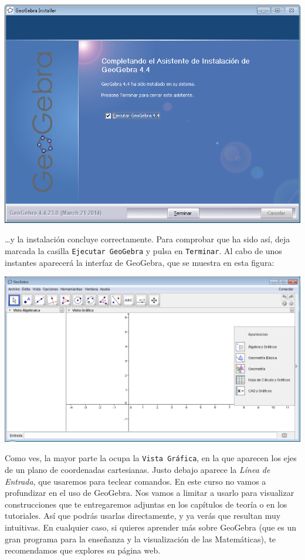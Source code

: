 \documentclass[10pt,a4paper]{article}\usepackage[]{graphicx}\usepackage[]{color}
\begin{document}
    \begin{center}
    \includegraphics[width=14cm]{../fig/Tut00-GeoGebraSetup05.png}
    \end{center}
\ldots y la instalación concluye correctamente. Para comprobar que ha sido así, deja marcada la
casilla {\tt Ejecutar GeoGebra} y pulsa en {\tt Terminar}. Al cabo de unos instantes aparecerá la
interfaz de GeoGebra, que se muestra en esta figura:
    \begin{center}
    \includegraphics[width=15cm]{../fig/Tut00-GeoGebraSetup06.png}
    \end{center}
Como ves, la mayor parte la ocupa la {\tt Vista Gráfica}, en la que aparecen los ejes de un plano
de coordenadas cartesianas.  Justo debajo aparece la {\em Línea de Entrada}, que usaremos para teclear comandos. En este curso no vamos a profundizar en el uso de GeoGebra. Nos vamos a
limitar a usarlo para visualizar construcciones que te entregaremos adjuntas en los capítulos de
teoría o en los tutoriales. Así que podrás usarlas directamente, y ya verás que resultan muy
intuitivas. En cualquier caso, si quieres aprender más sobre GeoGebra (que es un gran programa para
la enseñanza y la visualización de las Matemáticas), te recomendamos que explores su página web.
\end{document}
